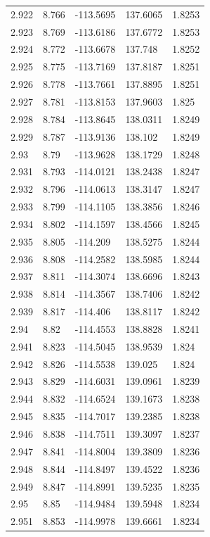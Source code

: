 \begin{tabular}{lllll}
2.922 & 8.766 & -113.5695 & 137.6065 & 1.8253 \\
2.923 & 8.769 & -113.6186 & 137.6772 & 1.8253 \\
2.924 & 8.772 & -113.6678 & 137.748 & 1.8252 \\
2.925 & 8.775 & -113.7169 & 137.8187 & 1.8251 \\
2.926 & 8.778 & -113.7661 & 137.8895 & 1.8251 \\
2.927 & 8.781 & -113.8153 & 137.9603 & 1.825 \\
2.928 & 8.784 & -113.8645 & 138.0311 & 1.8249 \\
2.929 & 8.787 & -113.9136 & 138.102 & 1.8249 \\
2.93 & 8.79 & -113.9628 & 138.1729 & 1.8248 \\
2.931 & 8.793 & -114.0121 & 138.2438 & 1.8247 \\
2.932 & 8.796 & -114.0613 & 138.3147 & 1.8247 \\
2.933 & 8.799 & -114.1105 & 138.3856 & 1.8246 \\
2.934 & 8.802 & -114.1597 & 138.4566 & 1.8245 \\
2.935 & 8.805 & -114.209 & 138.5275 & 1.8244 \\
2.936 & 8.808 & -114.2582 & 138.5985 & 1.8244 \\
2.937 & 8.811 & -114.3074 & 138.6696 & 1.8243 \\
2.938 & 8.814 & -114.3567 & 138.7406 & 1.8242 \\
2.939 & 8.817 & -114.406 & 138.8117 & 1.8242 \\
2.94 & 8.82 & -114.4553 & 138.8828 & 1.8241 \\
2.941 & 8.823 & -114.5045 & 138.9539 & 1.824 \\
2.942 & 8.826 & -114.5538 & 139.025 & 1.824 \\
2.943 & 8.829 & -114.6031 & 139.0961 & 1.8239 \\
2.944 & 8.832 & -114.6524 & 139.1673 & 1.8238 \\
2.945 & 8.835 & -114.7017 & 139.2385 & 1.8238 \\
2.946 & 8.838 & -114.7511 & 139.3097 & 1.8237 \\
2.947 & 8.841 & -114.8004 & 139.3809 & 1.8236 \\
2.948 & 8.844 & -114.8497 & 139.4522 & 1.8236 \\
2.949 & 8.847 & -114.8991 & 139.5235 & 1.8235 \\
2.95 & 8.85 & -114.9484 & 139.5948 & 1.8234 \\
2.951 & 8.853 & -114.9978 & 139.6661 & 1.8234 \\

\end{tabular}
